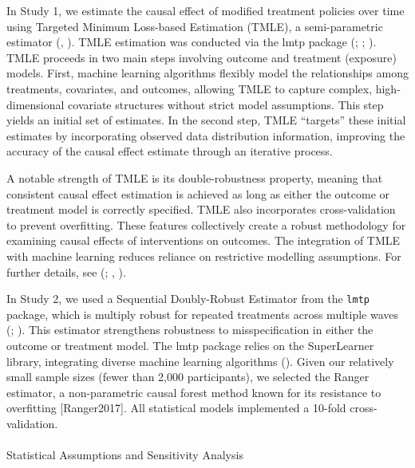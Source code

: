 \documentclass[
  single column]{article}
\makeatletter
\let\oldparagraph\paragraph
\renewcommand{\paragraph}{
    \@ifstar
      \xxxParagraphStar
      \xxxParagraphNoStar
  }
\newcommand{\xxxParagraphStar}[1]{\oldparagraph*{#1}\mbox{}}
\newcommand{\xxxParagraphNoStar}[1]{\oldparagraph{#1}\mbox{}}
\makeatother
\begin{document}
In Study 1, we estimate the causal effect of modified treatment policies
over time using Targeted Minimum Loss-based Estimation (TMLE), a
semi-parametric estimator (, ). TMLE estimation
was conducted via the lmtp package (; ; ). TMLE
proceeds in two main steps involving outcome and treatment (exposure)
models. First, machine learning algorithms flexibly model the
relationships among treatments, covariates, and outcomes, allowing TMLE
to capture complex, high-dimensional covariate structures without strict
model assumptions. This step yields an initial set of estimates. In the
second step, TMLE ``targets'' these initial estimates by incorporating
observed data distribution information, improving the accuracy of the
causal effect estimate through an iterative process.

A notable strength of TMLE is its double-robustness property, meaning
that consistent causal effect estimation is achieved as long as either
the outcome or treatment model is correctly specified. TMLE also
incorporates cross-validation to prevent overfitting. These features
collectively create a robust methodology for examining causal effects of
interventions on outcomes. The integration of TMLE with machine learning
reduces reliance on restrictive modelling assumptions. For further
details, see (;
,
).

In Study 2, we used a Sequential Doubly-Robust Estimator from the
\texttt{lmtp} package, which is multiply robust for repeated treatments
across multiple waves (; ). This
estimator strengthens robustness to misspecification in either the
outcome or treatment model. The lmtp package relies on the SuperLearner
library, integrating diverse machine learning algorithms
(). Given our
relatively small sample sizes (fewer than 2,000 participants), we
selected the Ranger estimator, a non-parametric causal forest method
known for its resistance to overfitting {[}Ranger2017{]}. All
statistical models implemented a 10-fold cross-validation.

\paragraph{Statistical Assumptions and Sensitivity
Analysis}\label{statistical-assumptions-and-sensitivity-analysis}
\end{document}
